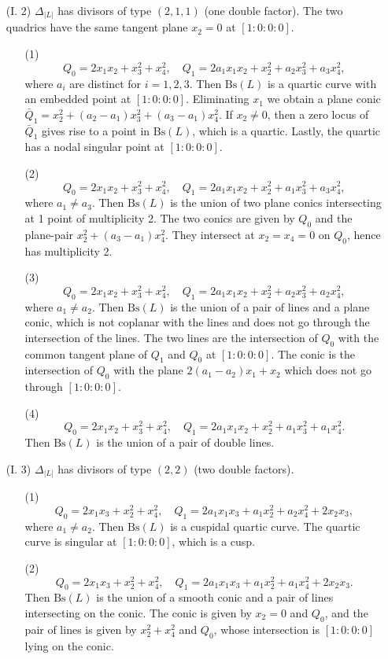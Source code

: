 \documentclass{amsart}[12pt]
\theoremstyle{definition}
\theoremstyle{remark}
\numberwithin{equation}{section}
\newcommand{\abs}[1]{\lvert#1\rvert}
\begin{document}
\begin{itemize}
\item[(I. 2)] $\Delta_{\abs{L}}$ has divisors of type $(2, 1, 1)$ (one double factor). The two quadrics have the same tangent plane $x_2 = 0$ at $[1\colon 0 \colon 0 \colon 0]$.
\begin{enumerate}
\item[(1)] 
\[
Q_0 = 2x_1x_2 + x_3^2 + x_4^2, \quad Q_1 = 2a_1x_1x_2 + x_2^2 + a_2x_3^2 + a_3x_4^2,
\]
where $a_i$ are distinct for $i = 1, 2, 3$. Then $\mathrm{Bs}(L)$ is a quartic curve with an embedded point at $[1\colon 0 \colon 0 \colon 0]$. Eliminating $x_1$ we obtain a plane conic $\bar{Q}_1 = x_2^2 + (a_2 - a_1)x_3^2 + (a_3 - a_1)x_4^2$. If $x_2 \neq 0$, then a zero locus of $\bar{Q}_1$ gives rise to a point in $\mathrm{Bs}(L)$, which is a quartic. Lastly, the quartic has a nodal singular point at $[1\colon 0 \colon 0 \colon 0]$.
\item[(2)] 
\[
Q_0 = 2x_1x_2 + x_3^2 + x_4^2, \quad Q_1 = 2a_1x_1x_2 + x_2^2 + a_1x_3^2 + a_3x_4^2,
\]
where $a_1 \neq a_3$. Then $\mathrm{Bs}(L)$ is the union of two plane conics intersecting at 1 point of multiplicity 2. The two conics are given by $Q_0$ and the plane-pair $x_2^2 + (a_3 - a_1)x_4^2$. They intersect at $x_2 = x_4 = 0$ on $Q_0$, hence has multiplicity 2.
\item[(3)] 
\[
Q_0 = 2x_1x_2 + x_3^2 + x_4^2, \quad Q_1 = 2a_1x_1x_2 + x_2^2 + a_2x_3^2 + a_2x_4^2,
\]
where $a_1 \neq a_2$. Then $\mathrm{Bs}(L)$ is the union of a pair of lines and a plane conic, which is not coplanar with the lines and does not go through the intersection of the lines. The two lines are the intersection of $Q_0$ with the common tangent plane of $Q_1$ and $Q_0$ at $[1\colon 0 \colon 0 \colon 0]$. The conic is the intersection of $Q_0$ with the plane $2(a_1 - a_2)x_1 + x_2$ which does not go through $[1\colon 0 \colon 0 \colon 0]$.
\item[(4)] 
\[
Q_0 = 2x_1x_2 + x_3^2 + x_4^2, \quad Q_1 = 2a_1x_1x_2 + x_2^2 + a_1x_3^2 + a_1x_4^2.
\]
Then $\mathrm{Bs}(L)$ is the union of a pair of double lines.
\end{enumerate}

\item[(I. 3)] $\Delta_{\abs{L}}$ has divisors of type $(2, 2)$ (two double factors). 
\begin{enumerate}
\item[(1)] 
\[
Q_0 = 2x_1x_3 + x_2^2 + x_4^2, \quad Q_1 = 2a_1x_1x_3 + a_1x_2^2 + a_2x_4^2 + 2x_2x_3,
\]
where $a_1 \neq a_2$. Then $\mathrm{Bs}(L)$ is a cuspidal quartic curve. The quartic curve is singular at $[1\colon 0 \colon 0 \colon 0]$, which is a cusp.
\item[(2)] 
\[
Q_0 = 2x_1x_3 + x_2^2 + x_4^2, \quad Q_1 = 2a_1x_1x_3 + a_1x_2^2 + a_1x_4^2 + 2x_2x_3.
\]
Then $\mathrm{Bs}(L)$ is the union of a smooth conic and a pair of lines intersecting on the conic. The conic is given by $x_2 = 0$ and $Q_0$, and the pair of lines is given by $x_2^2 + x_4^2$ and $Q_0$, whose intersection is $[1\colon 0 \colon 0 \colon 0]$ lying on the conic.
\end{enumerate}


\end{itemize}
\end{document}
